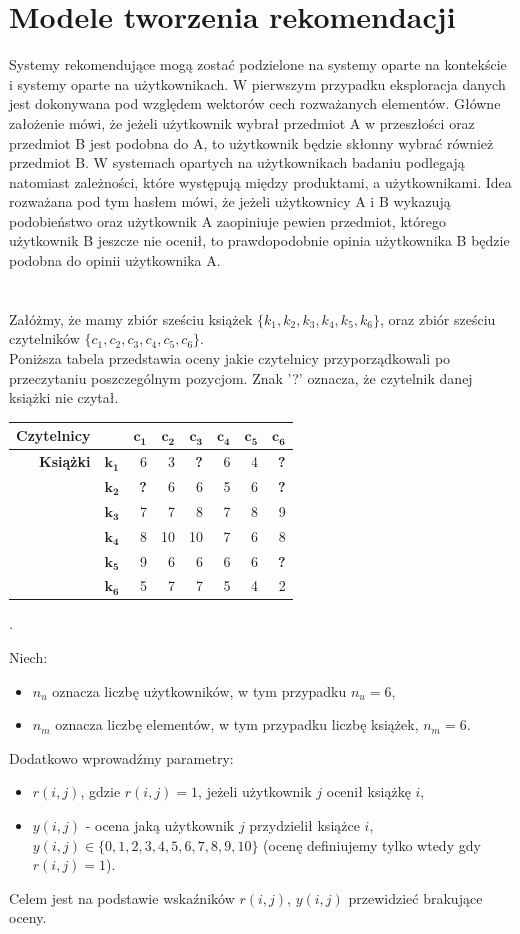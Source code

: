 \documentclass[12pt,a4paper]{report}
\begin{document}
\chapter{Modele tworzenia rekomendacji}
Systemy rekomendujące mogą zostać podzielone na systemy oparte na kontekście i systemy oparte na użytkownikach. W pierwszym przypadku eksploracja danych jest dokonywana pod względem wektorów cech rozważanych elementów. Główne założenie mówi, że jeżeli użytkownik wybrał przedmiot A w przeszłości oraz przedmiot B jest podobna do A, to użytkownik będzie skłonny wybrać również przedmiot B. W systemach opartych na użytkownikach badaniu podlegają natomiast zależności, które występują między produktami, a użytkownikami. Idea rozważana pod tym hasłem mówi, że jeżeli użytkownicy A i B wykazują podobieństwo oraz użytkownik A zaopiniuje pewien przedmiot, którego użytkownik B jeszcze nie ocenił, to prawdopodobnie opinia użytkownika B będzie podobna do opinii użytkownika A.
\\
\\
\\Załóżmy, że mamy zbiór sześciu książek $\{k_1, k_2, k_3, k_4, k_5, k_6\}$, oraz zbiór sześciu czytelników $\{c_1, c_2, c_3, c_4, c_5, c_6\}$.
\\Poniższa tabela przedstawia oceny jakie czytelnicy przyporządkowali po przeczytaniu poszczególnym pozycjom. Znak '?' oznacza, że czytelnik danej książki nie czytał.
\begin{center}
\begin{tabular}{|r|r|r|r|r|r|r|r|} \hline
\textbf{Czytelnicy} & & $\mathbf{c_1}$ & $\mathbf{c_2}$ & $\mathbf{c_3}$ & $\mathbf{c_4}$ & $\mathbf{c_5}$ & $\mathbf{c_6}$\\
\hline
\hline
\textbf{Książki} &$\mathbf{k_1}$ & 6 & 3 & \textbf{?} & 6 & 4 & \textbf{?}\\
\hline
&$\mathbf{k_2}$ & \textbf{?} & 6 & 6 & 5 & 6 & \textbf{?}\\
\hline
&$\mathbf{k_3}$ & 7 & 7 & 8 & 7 & 8 & 9 \\
\hline
&$\mathbf{k_4}$ & 8 & 10 & 10 & 7 & 6 & 8\\
\hline
&$\mathbf{k_5}$ & 9 & 6 & 6 & 6 & 6 & \textbf{?} \\
\hline
&$\mathbf{k_6}$ & 5 & 7 & 7 & 5 & 4 & 2\\
\hline
\end{tabular}.
\end{center}
Niech:
\begin{itemize}
\item $n_u$ oznacza liczbę użytkowników, w tym przypadku $n_u = 6$,
\item $n_m$ oznacza liczbę elementów, w tym przypadku liczbę książek, $n_m = 6$.
\end{itemize}
Dodatkowo wprowadźmy parametry:
\begin{itemize}
\item $r(i,j)$, gdzie $r(i,j)=1$, jeżeli użytkownik $j$ ocenił książkę $i$,
\item $y(i,j)$ - ocena jaką użytkownik $j$ przydzielił książce $i$, $y(i,j) \in \{0,1,2,3,4,5,6,7,8,9,10\}$ (ocenę definiujemy tylko wtedy gdy $r(i,j)=1$).
\end{itemize}
Celem jest na podstawie wskaźników $r(i,j)$, $y(i,j)$ przewidzieć brakujące oceny.
\end{document}
